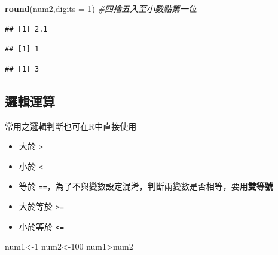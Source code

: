 \documentclass[]{book}
\newenvironment{Shaded}{\begin{snugshade}}{\end{snugshade}}
\newcommand{\KeywordTok}[1]{\textcolor[rgb]{0.13,0.29,0.53}{\textbf{{#1}}}}
\newcommand{\DataTypeTok}[1]{\textcolor[rgb]{0.13,0.29,0.53}{{#1}}}
\newcommand{\DecValTok}[1]{\textcolor[rgb]{0.00,0.00,0.81}{{#1}}}
\newcommand{\CommentTok}[1]{\textcolor[rgb]{0.56,0.35,0.01}{\textit{{#1}}}}
\newcommand{\NormalTok}[1]{{#1}}
\providecommand{\tightlist}{%
  \setlength{\itemsep}{0pt}\setlength{\parskip}{0pt}}
\theoremstyle{definition}
\theoremstyle{definition}
\theoremstyle{remark}
\begin{document}
\begin{Shaded}
\begin{Highlighting}[]
\KeywordTok{round}\NormalTok{(num2,}\DataTypeTok{digits =} \DecValTok{1}\NormalTok{) }\CommentTok{#四捨五入至小數點第一位}
\end{Highlighting}
\end{Shaded}

\begin{verbatim}
## [1] 2.1
\end{verbatim}

\begin{Shaded}
\end{Shaded}

\begin{verbatim}
## [1] 1
\end{verbatim}

\begin{Shaded}
\end{Shaded}

\begin{verbatim}
## [1] 3
\end{verbatim}

\subsection{邏輯運算}

常用之邏輯判斷也可在R中直接使用

\begin{itemize}
\tightlist
\item
  大於 \texttt{\textgreater{}}
\item
  小於 \texttt{\textless{}}
\item
  等於
  \texttt{==}，為了不與變數設定混淆，判斷兩變數是否相等，要用\textbf{雙等號}
\item
  大於等於 \texttt{\textgreater{}=}
\item
  小於等於 \texttt{\textless{}=}
\end{itemize}

\begin{Shaded}
\begin{Highlighting}[]
\NormalTok{num1<-}\DecValTok{1}
\NormalTok{num2<-}\DecValTok{100}
\NormalTok{num1>num2}
\end{Highlighting}
\end{Shaded}
\end{document}
